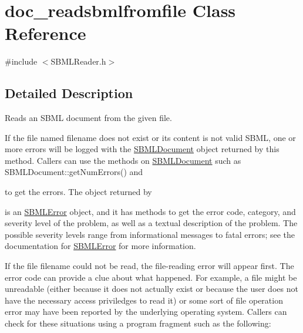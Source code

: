 \hypertarget{classdoc__readsbmlfromfile}{}\section{doc\+\_\+readsbmlfromfile Class Reference}
\label{classdoc__readsbmlfromfile}


{\ttfamily \#include $<$S\+B\+M\+L\+Reader.\+h$>$}



\subsection{Detailed Description}
Reads an S\+B\+ML document from the given file.

If the file named {\ttfamily filename} does not exist or its content is not valid S\+B\+ML, one or more errors will be logged with the \hyperlink{class_s_b_m_l_document}{S\+B\+M\+L\+Document} object returned by this method. Callers can use the methods on \hyperlink{class_s_b_m_l_document}{S\+B\+M\+L\+Document} such as S\+B\+M\+L\+Document\+::get\+Num\+Errors() and

to get the errors. The object returned by

is an \hyperlink{class_s_b_m_l_error}{S\+B\+M\+L\+Error} object, and it has methods to get the error code, category, and severity level of the problem, as well as a textual description of the problem. The possible severity levels range from informational messages to fatal errors; see the documentation for \hyperlink{class_s_b_m_l_error}{S\+B\+M\+L\+Error} for more information.

If the file {\ttfamily filename} could not be read, the file-\/reading error will appear first. The error code can provide a clue about what happened. For example, a file might be unreadable (either because it does not actually exist or because the user does not have the necessary access priviledges to read it) or some sort of file operation error may have been reported by the underlying operating system. Callers can check for these situations using a program fragment such as the following\+:

